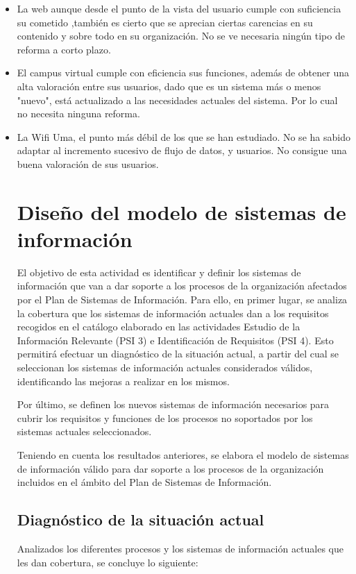 \documentclass[11pt,a4paper,spanish,twoside]{book}
\begin{document}
\begin{itemize}
  \item La web aunque desde el punto de la vista del usuario cumple con 
suficiencia su cometido ,también es cierto que se aprecian ciertas carencias en 
su contenido y sobre todo en su organización. No se ve necesaria ningún tipo de 
reforma a corto plazo.
  \item El campus virtual cumple con eficiencia sus funciones, además de 
obtener una alta valoración entre sus usuarios, dado que es un sistema más o 
menos "nuevo", está actualizado a las necesidades actuales del sistema. Por lo 
cual no necesita ninguna reforma.
  \item La Wifi Uma, el punto más débil de los que se han estudiado. No se ha 
sabido adaptar al incremento sucesivo de flujo de datos, y usuarios. No 
consigue una buena valoración de sus usuarios. 
\chapter{Diseño del modelo de sistemas de información}
El objetivo de esta actividad es identificar y definir los sistemas de
información que van a dar soporte a los procesos de la organización afectados
por el Plan de Sistemas de Información. Para ello, en primer lugar, se
analiza la cobertura que los sistemas de información actuales dan a los
requisitos recogidos en el catálogo elaborado en las actividades Estudio de
la Información Relevante (PSI 3) e Identificación de Requisitos (PSI 4). Esto
permitirá efectuar un diagnóstico de la situación actual, a partir del cual
se seleccionan los sistemas de información actuales considerados válidos,
identificando las mejoras a realizar en los mismos. 

Por último, se definen los nuevos sistemas de información necesarios para
cubrir los requisitos y funciones de los procesos no soportados por los
sistemas actuales seleccionados. 

Teniendo en cuenta los resultados anteriores, se elabora el modelo de
sistemas de información válido para dar soporte a los procesos de la
organización incluidos en el ámbito del Plan de Sistemas de Información. 

\section{Diagnóstico de la situación actual}
Analizados los diferentes procesos y los sistemas de información actuales que les dan cobertura, se concluye lo siguiente:


\end{itemize}
\end{document}
